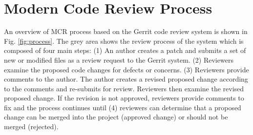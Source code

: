 

\section{Modern Code Review Process}

An overview of MCR process based on the Gerrit code review system is shown in Fig. \ref{fig:process}.
The grey area shows the review process of the system which is composed of four main steps:
(1) An author creates a patch and submits a set of new or modified files as a review request to the Gerrit system.
(2) Reviewers examine the proposed code changes for defects or concerns.
(3) Reviewers provide comments to the author.
The author creates a revised proposed change according to the comments and re-submits for review.
Reviewers then examine the revised proposed change.
If the revision is not approved, reviewers provide comments to fix and the process continues until
(4) reviewers can determine that a proposed change can be merged into the project (approved change) or should not be merged (rejected).


